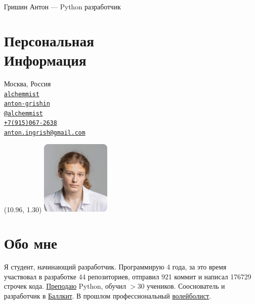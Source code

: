 \documentclass[margin,line]{resume}
\begin{document}
{\vspace*{-13mm}\sc \large Гришин Антон — Python разработчик} \\
\begin{resume}
  \begin{minipage}[t]{0.55\textwidth}
    \section{\mysidestyle Персональная\\Информация}
    Москва, Россия \\
    \faGithub  \space
    \href{https://github.com/alchemmist/}{\texttt{alchemmist}} \\
    \faLinkedin \space
    \href{https://www.linkedin.com/in/anton-grishin-6966a8362/}{\texttt{anton-grishin}}
    \\
    \faPaperPlane \space \href{https://t.me/alchemmist}{\texttt{@alchemmist}} \\
    \faPhone \space
    \href{tel:+1234567890}{\color{blue}\texttt{+7(915)067-2638}}  \\
    \faEnvelope \space
    \href{mailto:anton.ingrish@gmail.com}{\color{blue}\texttt{anton.ingrish@gmail.com}}
  \end{minipage}

  \begin{minipage}[H]{0.18\textwidth}
    \begin{textblock}{7}(10.96, 1.30)
      \includegraphics[width=0.255\textwidth]{../images/avatar.png}
    \end{textblock}
  \end{minipage}

  \vspace{-7mm}
  \section{\mysidestyle Обо мне}
  Я студент, начинающий разработчик. Программирую 4 года, за
  это время участвовал в разработке 44 репозиториев, отправил 921
  коммит и написал 176729 строчек кода.
  \href{https://www.avito.ru/moskva/predlozheniya_uslug/prepodavatel_programmirovaniya_na_python_2556461612}{Преподаю}
  Python, обучил $> 30$ учеников. Сооснователь и
  разработчик в \href{https://ballkit.ru/}{Баллкит}. В прошлом профессиональный
  \href{https://alchemmist.github.io/CV/attachments/sport.pdf}{волейболист}.


\end{resume}
\end{document}
